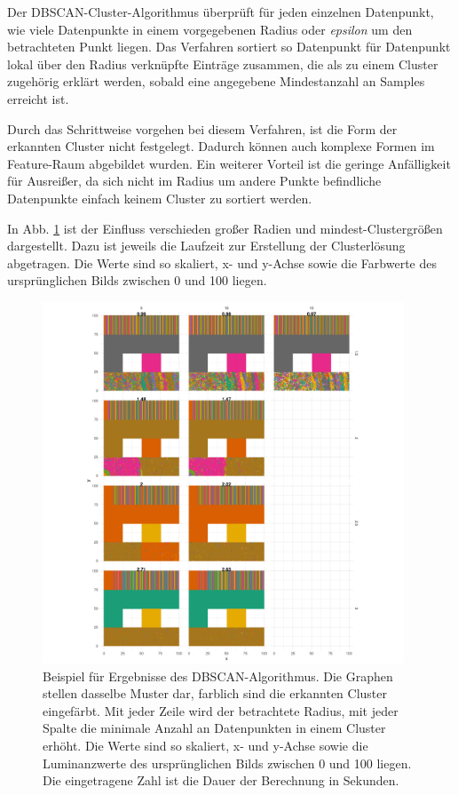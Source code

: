 \documentclass[
  12pt,
]{book}
\begin{document}
Der DBSCAN-Cluster-Algorithmus überprüft für jeden einzelnen Datenpunkt, wie viele Datenpunkte in einem vorgegebenen Radius oder \emph{epsilon} um den betrachteten Punkt liegen. Das Verfahren sortiert so Datenpunkt für Datenpunkt lokal über den Radius verknüpfte Einträge zusammen, die als zu einem Cluster zugehörig erklärt werden, sobald eine angegebene Mindestanzahl an Samples erreicht ist.

Durch das Schrittweise vorgehen bei diesem Verfahren, ist die Form der erkannten Cluster nicht festgelegt. Dadurch können auch komplexe Formen im Feature-Raum abgebildet wurden. Ein weiterer Vorteil ist die geringe Anfälligkeit für Ausreißer, da sich nicht im Radius um andere Punkte befindliche Datenpunkte einfach keinem Cluster zu sortiert werden.

In Abb. \ref{fig:dbscanExample} ist der Einfluss verschieden großer Radien und mindest-Clustergrößen dargestellt. Dazu ist jeweils die Laufzeit zur Erstellung der Clusterlösung abgetragen. Die Werte sind so skaliert, x- und y-Achse sowie die Farbwerte des ursprünglichen Bilds zwischen 0 und 100 liegen.





\begin{figure}

{\centering \includegraphics[width=0.96\textwidth]{../imgs/dbscan} 

}

\caption[Beispiel für Ergebnisse des DBSCAN-Algorithmus.]{Beispiel für Ergebnisse des DBSCAN-Algorithmus. Die Graphen stellen dasselbe Muster dar, farblich sind die erkannten Cluster eingefärbt. Mit jeder Zeile wird der betrachtete Radius, mit jeder Spalte die minimale Anzahl an Datenpunkten in einem Cluster erhöht. Die Werte sind so skaliert, x- und y-Achse sowie die Luminanzwerte des ursprünglichen Bilds zwischen 0 und 100 liegen. Die eingetragene Zahl ist die Dauer der Berechnung in Sekunden.}\label{fig:dbscanExample}
\end{figure}
\end{document}
